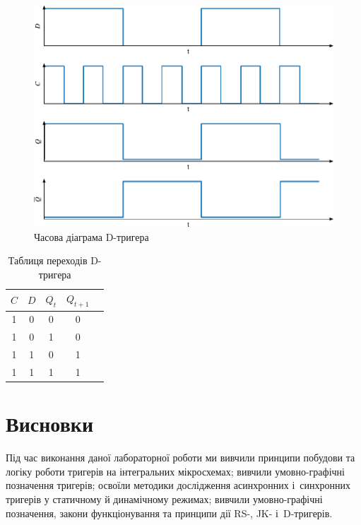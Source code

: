 \documentclass[a4paper,oneside,DIV=10,12pt]{scrartcl}
\begin{document}
			\begin{figure}[!htbp]
			\centering
				\includegraphics[width = \textwidth]{plots/02-pdf/04-d-edited.pdf}
			\caption{Часова діаграма D-тригера}
			\label{fig:d-flipflop-dynamic-mode-time-diagram}
			\end{figure}
			
			\begin{table}[!htbp]
			\centering
				\begin{tabular}{ccccc}
					\toprule
						$C$ & $D$ & $Q_t$ & $Q_{t + 1}$ \\
					\midrule
						1 & 0 & 0 & 0\\
						1 & 0 & 1 & 0\\
						1 & 1 & 0 & 1\\
						1 & 1 & 1 & 1\\
					\bottomrule
				\end{tabular}
			\caption{Таблиця переходів D-тригера}
			\label{tab:d-flipflop-dynamic-mode-truth-table}
			\end{table}
			
	\section{Висновки}
		Під час виконання даної лабораторної роботи ми вивчили принципи побудови та логіку роботи тригерів на інтегральних мікросхемах; вивчили умовно-графічні позначення тригерів; освоїли методики дослідження асинхронних і~синхронних тригерів у статичному й динамічному режимах; вивчили умовно-графічні позначення, закони функціонування та принципи дії RS-, JK- і~D-тригерів.
		
\end{document}
